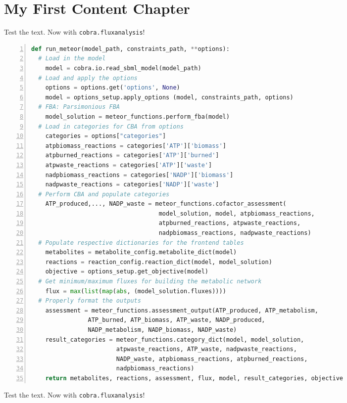 \chapter{My First Content Chapter}
\label{chapterlabel2}

\blindtext


Test the text. Now with \texttt{cobra.flux\textunderscore analysis}!

\begin{spacing}{1.5}
\begin{lstlisting}[caption={Pseudocode snippet for \texttt{1-data\textunderscore preprocess.py}}, breaklines=true,basewidth=6pt,frame=single,language=Python, numbers=left, prebreak=**, postbreak=**, label={lst:code}]
def run_meteor(model_path, constraints_path, **options):
  # Load in the model
	model = cobra.io.read_sbml_model(model_path)
  # Load and apply the options
	options = options.get('options', None)
	model = options_setup.apply_options (model, constraints_path, options)
  # FBA: Parsimonious FBA
	model_solution = meteor_functions.perform_fba(model)
  # Load in categories for CBA from options
	categories = options["categories"]
	atpbiomass_reactions = categories['ATP']['biomass']
	atpburned_reactions = categories['ATP']['burned']
	atpwaste_reactions = categories['ATP']['waste'] 
	nadpbiomass_reactions = categories['NADP']['biomass']
	nadpwaste_reactions = categories['NADP']['waste'] 
  # Perform CBA and populate categories
	ATP_produced,..., NADP_waste = meteor_functions.cofactor_assessment(
                                    model_solution, model, atpbiomass_reactions,
                                    atpburned_reactions, atpwaste_reactions, 
                                    nadpbiomass_reactions, nadpwaste_reactions)
  # Populate respective dictionaries for the frontend tables
	metabolites = metabolite_config.metabolite_dict(model)
	reactions = reaction_config.reaction_dict(model, model_solution)
	objective = options_setup.get_objective(model)
  # Get minimum/maximum fluxes for building the metabolic network
	flux = max(list(map(abs, (model_solution.fluxes))))
  # Properly format the outputs
	assessment = meteor_functions.assessment_output(ATP_produced, ATP_metabolism,
                ATP_burned, ATP_biomass, ATP_waste, NADP_produced,
                NADP_metabolism, NADP_biomass, NADP_waste)
	result_categories = meteor_functions.category_dict(model, model_solution,
                        atpwaste_reactions, ATP_waste, nadpwaste_reactions,
                        NADP_waste, atpbiomass_reactions, atpburned_reactions,
                        nadpbiomass_reactions)
	return metabolites, reactions, assessment, flux, model, result_categories, objective
\end{lstlisting} 
\end{spacing}


Test the text. Now with \texttt{cobra.flux\textunderscore analysis}!